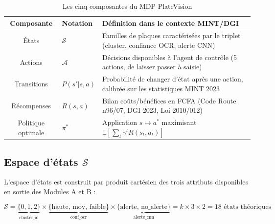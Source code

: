 \begin{table}[H]
\centering
\caption{Les cinq composantes du MDP PlateVision}
\label{tab:c:mdp_tuple}
\begin{tabular}{clp{8cm}}
\toprule
\textbf{Composante} & \textbf{Notation} & \textbf{D\'{e}finition dans le contexte MINT/DGI} \\
\midrule
\'{E}tats          & $\mathcal{S}$   & Familles de plaques caract\'{e}ris\'{e}es par le triplet
                                       (cluster, confiance OCR, alerte CNN) \\
Actions            & $\mathcal{A}$   & D\'{e}cisions disponibles \`{a} l'agent de contr\^{o}le
                                       (5 actions, de laisser passer \`{a} saisie) \\
Transitions        & $P(s'|s,a)$     & Probabilit\'{e} de changer d'\'{e}tat apr\`{e}s une action,
                                       calibr\'{e}e sur les statistiques MINT 2023 \\
R\'{e}compenses    & $R(s,a)$        & Bilan co\^{u}ts/b\'{e}n\'{e}fices en FCFA (Code Route
                                       n\textordmasculine{}96/07, DGI 2023, Loi 2010/012) \\
Politique optimale & $\pi^*$         & Application $s \mapsto a^*$ maximisant
                                       $\mathbb{E}\!\left[\sum_{t} \gamma^t R(s_t, a_t)\right]$ \\
\bottomrule
\end{tabular}
\end{table}

\subsection{Espace d'\'{e}tats $\mathcal{S}$}
\label{sec:c:states}

L'espace d'\'{e}tats est construit par produit cart\'{e}sien des trois
attributs disponibles en sortie des Modules A et B :

\begin{equation}
\mathcal{S} = \underbrace{\{0,1,2\}}_{\text{cluster\_id}} \times
              \underbrace{\{\text{haute, moy, faible}\}}_{\text{conf\_ocr}} \times
              \underbrace{\{\text{alerte, no\_alerte}\}}_{\text{alerte\_cnn}}
= k \times 3 \times 2 = 18 \text{ \'{e}tats th\'{e}oriques}
\label{eq:state_space}
\end{equation}


